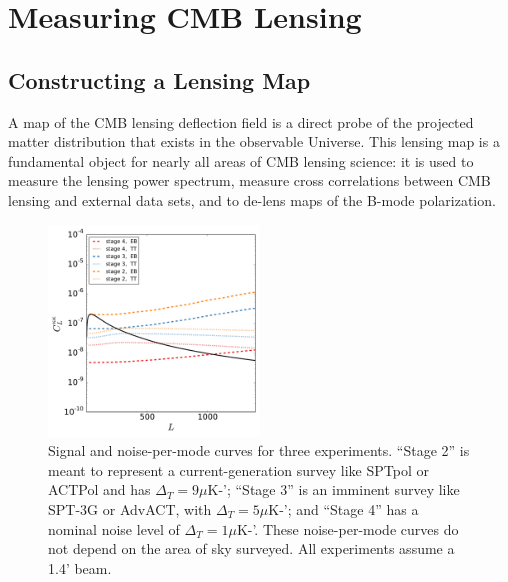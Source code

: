 \section{Measuring CMB Lensing}

\subsection{Constructing a Lensing Map}\label{kappaMap}

A map of the CMB lensing deflection field is a direct probe of the projected matter distribution that exists in the observable Universe. This lensing map is a fundamental object for nearly all areas of CMB lensing science: it is used to measure the lensing power spectrum, measure cross correlations between CMB lensing and external data sets, and to de-lens maps of the B-mode polarization.  

\begin{figure}[htbp]
\centering
\includegraphics[width=0.5\textwidth]{CMBLensing/n0s_s4.pdf}
\caption{Signal and noise-per-mode curves for three experiments. ``Stage 2'' is meant to represent a current-generation survey like SPTpol or ACTPol and has $\Delta_T = 9 \mu$K-';  ``Stage 3'' is an imminent survey like SPT-3G or AdvACT, with $\Delta_T = 5 \mu$K-'; and ``Stage 4'' has a nominal noise level of  $\Delta_T = 1 \mu$K-'.   These noise-per-mode curves do not depend on the area of sky surveyed.  All experiments assume a 1.4' beam.}  
\label{n0s_s4}
\end{figure}



